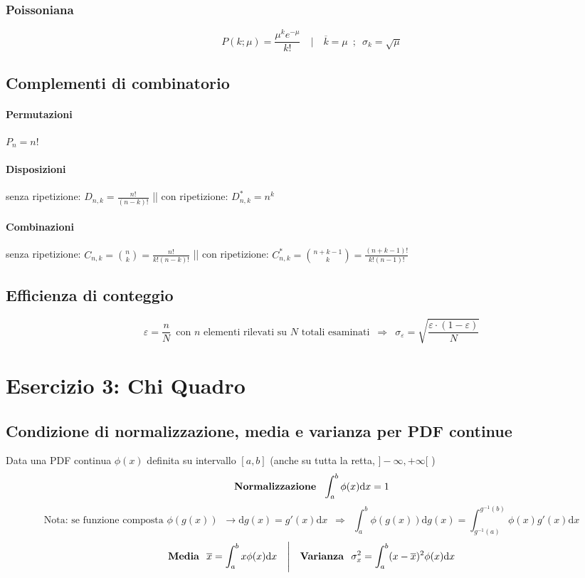 \documentclass[11pt]{article}
\begin{document}
\subsubsection*{Poissoniana}
\[P(k; \mu) = \frac{\mu^k e^{-\mu}}{k!} \quad \Bigg| \quad \overline{k} = \mu \enspace; \enspace \sigma_k = \sqrt{\mu}\]

\subsection{Complementi di combinatorio}
\paragraph{Permutazioni} $P_n = n!$
\paragraph{Disposizioni} senza ripetizione: $D_{n, k} = \frac{n!}{(n-k)!}$ || con ripetizione: $D_{n, k}^* = n^k$
\paragraph{Combinazioni} senza ripetizione: $C_{n, k} = \binom{n}{k} = \frac{n!}{k! (n-k)!}$ || con ripetizione: $C_{n, k}^* = \binom{n + k - 1}{k} = \frac{(n+k-1)!}{k! (n-1)!}$

\subsection{Efficienza di conteggio}
\[\varepsilon = \frac{n}{N} \enspace \textrm{con $n$ elementi rilevati su $N$ totali esaminati} \enspace \Rightarrow \enspace \sigma_{\varepsilon} = \sqrt{\frac{\varepsilon \cdot (1 - \varepsilon)}{N}}\]

\section{Esercizio 3: Chi Quadro}

\subsection{Condizione di normalizzazione, media e varianza per PDF continue}
Data una PDF continua $\phi(x)$ definita su intervallo $[a, b]$ (anche su tutta la retta, $]-\infty, +\infty[$ )
\[\textrm{\textbf{Normalizzazione } } \int _a^b \phi(x) \textrm{d}x = 1\]
\[\textrm{Nota: se funzione composta } \phi(g(x)) \enspace \rightarrow \textrm{d}g(x) = g'(x)\textrm{d}x \enspace \Rightarrow \enspace \int_{a}^{b} \phi(g(x)) \textrm{d}g(x) = \int_{g^{-1}(a)}^{g^{-1}(b)} \phi(x) g'(x)\textrm{d}x\]
\[\textrm{\textbf{Media } } \overline{x} = \int_a^b x \phi(x) \textrm{d}x \quad \Bigg| \quad \textrm{\textbf{Varianza } } \sigma_x^2 = \int_a^b (x-\overline{x})^2 \phi(x) \textrm{d}x\]
\end{document}

